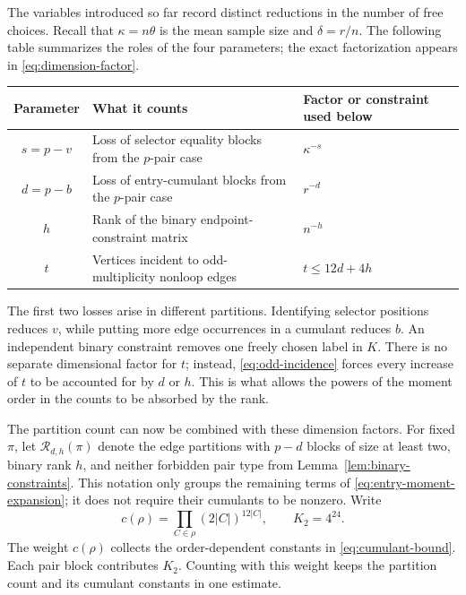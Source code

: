 \documentclass[11pt]{article}
\theoremstyle{definition}
\theoremstyle{remark}
\theoremstyle{plain}
\begin{document}
The variables introduced so far record distinct reductions in the
number of free choices. Recall that $\kappa=n\theta$ is the mean
sample size and $\delta=r/n$. The following table summarizes the
roles of the four parameters; the exact factorization appears in
\eqref{eq:dimension-factor}.
\begin{center}
\begin{tabular}{c|p{}|p{}}
Parameter & What it counts & Factor or constraint used below\\ \hline
$s=p-v$ & Loss of selector equality blocks from the $p$-pair case
         & $\kappa^{-s}$\\
$d=p-b$ & Loss of entry-cumulant blocks from the $p$-pair case
         & $r^{-d}$\\
$h$ & Rank of the binary endpoint-constraint matrix
     & $n^{-h}$\\
$t$ & Vertices incident to odd-multiplicity nonloop edges
     & $t\le12d+4h$
\end{tabular}
\end{center}
The first two losses arise in different partitions. Identifying
selector positions reduces $v$, while putting more edge
occurrences in a cumulant reduces $b$. An independent binary
constraint removes one freely chosen label in $K$.
There is no separate dimensional factor for $t$; instead,
\eqref{eq:odd-incidence} forces every increase of $t$ to be
accounted for by $d$ or $h$. This is what allows the powers
of the moment order in the counts to be absorbed by the rank.

The partition count can now be combined with these dimension factors.
For fixed $\pi$, let $\mathcal R_{d,h}(\pi)$ denote the edge
partitions with $p-d$ blocks of size at least two, binary rank $h$,
and neither forbidden pair type from Lemma~\ref{lem:binary-constraints}.
This notation only groups the remaining terms of
\eqref{eq:entry-moment-expansion}; it does not require their
cumulants to be nonzero. Write
\[
 c(\rho)=\prod_{C\in\rho}(2|C|)^{12|C|},\qquad K_2=4^{24}.
\]
The weight $c(\rho)$ collects the order-dependent constants in
\eqref{eq:cumulant-bound}. Each pair block contributes $K_2$.
Counting with this weight keeps the partition count and its
cumulant constants in one estimate.
\end{document}
